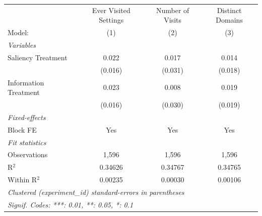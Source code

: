 \begin{tabular}{lccc}
   \tabularnewline \midrule \midrule
                         & Ever Visited Settings & Number of Visits & Distinct Domains \\   
   Model:                & (1)                   & (2)              & (3)\\  
   \midrule
   \emph{Variables}\\
   Saliency Treatment    & 0.022                 & 0.017            & 0.014\\   
                         & (0.016)               & (0.031)          & (0.018)\\   
   Information Treatment & 0.023                 & 0.008            & 0.019\\   
                         & (0.016)               & (0.030)          & (0.019)\\   
   \midrule
   \emph{Fixed-effects}\\
   Block FE              & Yes                   & Yes              & Yes\\  
   \midrule
   \emph{Fit statistics}\\
   Observations          & 1,596                 & 1,596            & 1,596\\  
   R$^2$                 & 0.34626               & 0.34767          & 0.34765\\  
   Within R$^2$          & 0.00235               & 0.00030          & 0.00106\\  
   \midrule \midrule
   \multicolumn{4}{l}{\emph{Clustered (experiment\_id) standard-errors in parentheses}}\\
   \multicolumn{4}{l}{\emph{Signif. Codes: ***: 0.01, **: 0.05, *: 0.1}}\\
\end{tabular}
